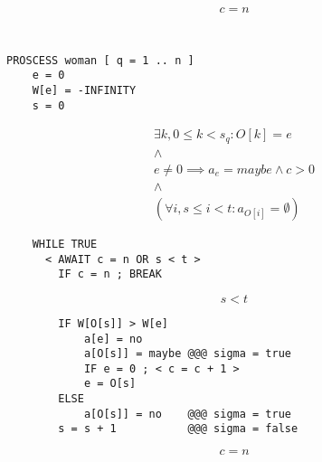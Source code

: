 \documentclass{article}
\begin{document}
\begin{displaymath}
c = n
\end{displaymath}
\begin{verbatim}

\end{verbatim}
\newpage
\begin{verbatim}

PROSCESS woman [ q = 1 .. n ]
    e = 0
    W[e] = -INFINITY
    s = 0
\end{verbatim}
\begin{displaymath}
\begin{matrix}
\exists k, 0 \leq k < s_q : O[k] = e \\
\land \\
e \neq 0 \implies a_e = maybe \land c > 0 \\
\land \\
(\forall i, s \leq i < t : a_{O[i]} = \emptyset)
\end{matrix}
\end{displaymath}
\begin{verbatim}
    WHILE TRUE
      < AWAIT c = n OR s < t >
        IF c = n ; BREAK
\end{verbatim}
\begin{displaymath}
s < t
\end{displaymath}
\begin{verbatim}
        IF W[O[s]] > W[e]
            a[e] = no
            a[O[s]] = maybe @@@ sigma = true
            IF e = 0 ; < c = c + 1 >
            e = O[s]
        ELSE
            a[O[s]] = no    @@@ sigma = true
        s = s + 1           @@@ sigma = false
\end{verbatim}
\begin{displaymath}
c = n
\end{displaymath}
\end{document}
